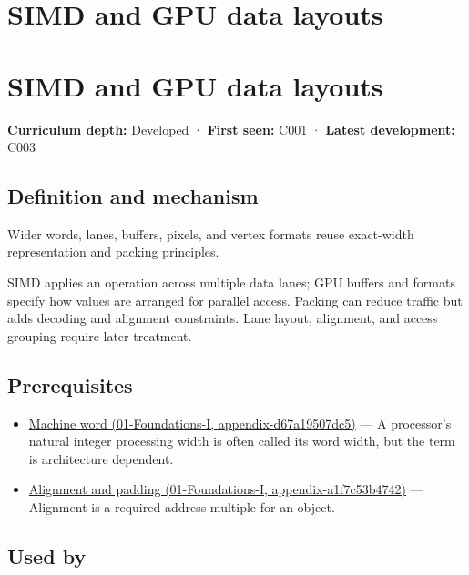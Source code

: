 \hypertarget{appendix-3c7b1a56de01}{}
\section*{SIMD and GPU data layouts}
\section{SIMD and GPU data layouts}\label{appendix-3c7b1a56de01-simd-and-gpu-data-layouts}

\textbf{Curriculum depth:} Developed · \textbf{First seen:} C001 · \textbf{Latest development:} C003

\subsection{Definition and mechanism}\label{appendix-3c7b1a56de01-definition-and-mechanism}

Wider words, lanes, buffers, pixels, and vertex formats reuse exact-width representation and packing principles.

SIMD applies an operation across multiple data lanes; GPU buffers and formats specify how values are arranged for parallel access. Packing can reduce traffic but adds decoding and alignment constraints. Lane layout, alignment, and access grouping require later treatment.

\subsection{Prerequisites}\label{appendix-3c7b1a56de01-prerequisites}

\begin{itemize}
\tightlist
\item
  \href{../01-Foundations-I/main.pdf\#nameddest=appendix-d67a19507dc5}{Machine word (01-Foundations-I, appendix-d67a19507dc5)} --- A processor's natural integer processing width is often called its word width, but the term is architecture dependent.
\item
  \href{../01-Foundations-I/main.pdf\#nameddest=appendix-a1f7c53b4742}{Alignment and padding (01-Foundations-I, appendix-a1f7c53b4742)} --- Alignment is a required address multiple for an object.
\end{itemize}

\subsection{Used by}\label{appendix-3c7b1a56de01-used-by}

